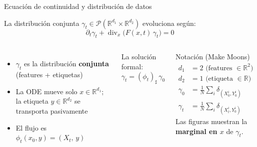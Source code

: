 \documentclass[10pt]{beamer}
\begin{document}
\begin{frame}{Ecuación de continuidad y distribución de datos}

La distribución conjunta $\gamma_t\in\mathcal{P}(\mathbb{R}^{d_1}\times\mathbb{R}^{d_2})$ evoluciona según:
\[
  \partial_t\gamma_t + \operatorname{div}_x\!\bigl(F(x,t)\,\gamma_t\bigr) = 0
\]

\begin{columns}
\begin{itemize}
  \item $\gamma_t$ es la distribución \textbf{conjunta} (features + etiquetas)
  \item La ODE mueve solo $x\in\mathbb{R}^{d_1}$; la etiqueta $y\in\mathbb{R}^{d_2}$ se transporta pasivamente
  \item El flujo es $\phi_t(x_0,y) = (X_t,\,y)$
\end{itemize}

\medskip
La solución formal:
\[
  \gamma_t = (\phi_t)_\sharp\,\gamma_0
\]

\begin{alertblock}{Notación (Make Moons)}
  \begin{align*}
    d_1 &= 2 \text{ (features $\in\mathbb{R}^2$)}\\
    d_2 &= 1 \text{ (etiqueta $\in\mathbb{R}$)}\\[4pt]
    \gamma_0 &= \frac{1}{N}\sum_i\delta_{(X_0^i,Y_0^i)}\\[4pt]
    \gamma_t &= \frac{1}{N}\sum_i\delta_{(X_t^i,Y_0^i)}
  \end{align*}
  Las figuras muestran la \textbf{marginal en $x$} de $\gamma_t$.
\end{alertblock}
\end{columns}
\end{frame}
\end{document}
